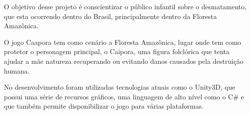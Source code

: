 O objetivo desse projeto é conscientizar o público infantil sobre o desmatamento, que esta ocorrendo dentro do Brasil, principalmente dentro da Floresta Amazônica.

O jogo Caapora tem como cenário a Floresta Amazônica, lugar onde tem como protetor o personagem principal, o Caipora, uma figura folclórica que tenta ajudar a mãe natureza recuperando ou evitando danos causados pela destruição humana.

No desenvolvimento foram utilizadas tecnologias atuais como o Unity3D, que possui uma série de recursos gráficos, uma linguagem de alto nível como o C\# e que também permite disponibilizar o jogo para várias plataformas.


